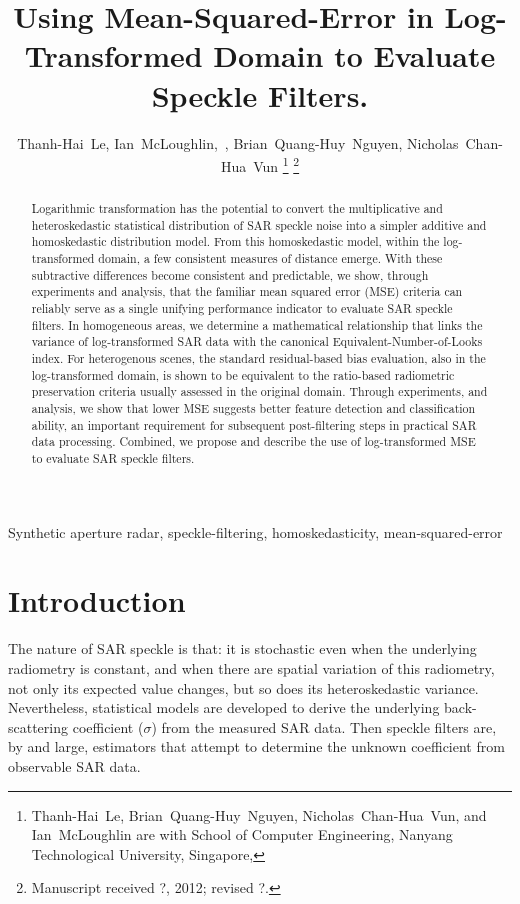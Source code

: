 \documentclass[journal]{IEEEtran}
\title{ 
	Using Mean-Squared-Error in Log-Transformed Domain to Evaluate Speckle Filters.
}
\author{Thanh-Hai~Le,
        Ian~McLoughlin,~\IEEEmembership{Senior Member,~IEEE}, 
	Brian~Quang-Huy~Nguyen,
	Nicholas~Chan-Hua~Vun%
\thanks{Thanh-Hai~Le, Brian~Quang-Huy~Nguyen, Nicholas~Chan-Hua~Vun, and Ian~McLoughlin are with School of Computer Engineering, 
Nanyang Technological University, Singapore,}%
\thanks{Manuscript received ?, 2012; revised ?.}}
\begin{document}
\maketitle

\begin{abstract}

Logarithmic transformation has the potential to convert 
	the multiplicative and heteroskedastic statistical distribution of SAR speckle noise into 
	a simpler additive and homoskedastic distribution model.
From this homoskedastic model, within the log-transformed domain, 
	a few consistent measures of distance emerge.
With these subtractive differences become consistent and predictable, 
	we show, through experiments and analysis, that 
	the familiar mean squared error (MSE) criteria can reliably serve 
		as a single unifying performance indicator to evaluate SAR speckle filters. 
In homogeneous areas, we determine a mathematical relationship that links the variance of log-transformed SAR data with the canonical Equivalent-Number-of-Looks index.
For heterogenous scenes, the standard residual-based bias evaluation, also in the log-transformed domain, 
	is shown to be equivalent to the ratio-based radiometric preservation criteria usually assessed in the original domain. 
Through experiments, and analysis, we show that lower MSE suggests better feature detection and classification ability, an important requirement for subsequent post-filtering steps in practical SAR data processing.
Combined, we propose and describe the use of log-transformed MSE to evaluate SAR speckle filters.

\end{abstract}

\begin{IEEEkeywords}
Synthetic aperture radar, speckle-filtering, homoskedasticity, mean-squared-error
\end{IEEEkeywords}


\IEEEpeerreviewmaketitle

\section{Introduction}

The nature of SAR speckle is that:
	it is stochastic even when the underlying radiometry is constant, 
	and when there are spatial variation of this radiometry, not only its expected value changes, but so does its heteroskedastic variance.
Nevertheless, statistical models are developed to derive the underlying back-scattering coefficient ($\sigma$) from the measured SAR data. 
Then speckle filters are, by and large, estimators that attempt to determine the unknown coefficient from observable SAR data. 
\end{document}
